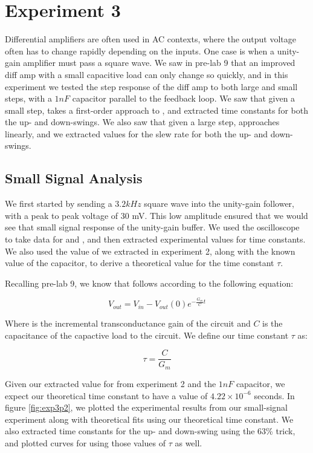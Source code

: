 \section*{Experiment 3}
Differential amplifiers are often used in AC contexts, where the output voltage often has to change rapidly depending on the inputs. One case is when a unity-gain amplifier must pass a square wave. We saw in pre-lab 9 that an improved diff amp with a small capacitive load can only change \Vout so quickly, and in this experiment we tested the step response of the diff amp to both large and small steps, with a $1 nF$ capacitor parallel to the feedback loop. We saw that given a small step, \Vout takes a first-order approach to \Vin, and extracted time constants for both the up- and down-swings. We also saw that given a large step, \Vout approaches \Vin linearly, and we extracted values for the slew rate for both the up- and down-swings.

\subsection*{Small Signal Analysis}

We first started by sending a $3.2 kHz$ square wave into the unity-gain follower, with a peak to peak voltage of 30 mV. This low amplitude ensured that we would see that small signal response of the unity-gain buffer. We used the oscilloscope to take data for \Vin and \Vout, and then extracted experimental values for time constants. We also used the value of \Gm we extracted in experiment 2, along with the known value of the capacitor, to derive a theoretical value for the time constant $\tau$.

Recalling pre-lab 9, we know that \Vout follows \Vin according to the following equation:

\begin{equation}
V_{out} = V_{in} - V_{out}(0)e^{-\frac{G_m}{C}t}
\end{equation}

Where \Gm is the incremental transconductance gain of the circuit and $C$ is the capacitance of the capactive load to the circuit. We define our time constant $\tau$ as:

\begin{equation}
\tau = \frac{C}{G_m}
\end{equation}	

Given our extracted value for \Gm from experiment 2 and the $1 nF$ capacitor, we expect our theoretical time constant to have a value of $4.22 \times 10^{-6}$ seconds. In figure \ref{fig:exp3p2}, we plotted the experimental results from our small-signal experiment along with theoretical fits using our theoretical time constant. We also extracted time constants for the up- and down-swing using the 63\% trick, and plotted curves for using those values of $\tau$ as well.

